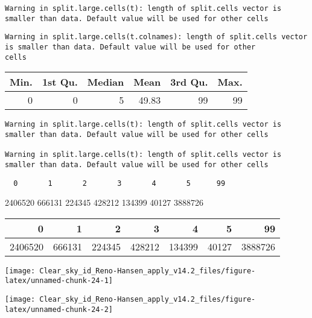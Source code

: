 \documentclass[
  10pt,
  a4paper,oneside]{article}
\begin{document}
\begin{verbatim}
Warning in split.large.cells(t): length of split.cells vector is smaller than data. Default value will be used for other cells
\end{verbatim}

\begin{verbatim}
Warning in split.large.cells(t.colnames): length of split.cells vector is smaller than data. Default value will be used for other
cells
\end{verbatim}

\begin{longtable}[]{@{}rrrrrr@{}}
\toprule
Min. & 1st Qu. & Median & Mean & 3rd Qu. & Max.\tabularnewline
\midrule
\endhead
0 & 0 & 5 & 49.83 & 99 & 99\tabularnewline
\bottomrule
\end{longtable}

\begin{verbatim}
Warning in split.large.cells(t): length of split.cells vector is smaller than data. Default value will be used for other cells

Warning in split.large.cells(t): length of split.cells vector is smaller than data. Default value will be used for other cells
\end{verbatim}

\begin{verbatim}
  0       1       2       3       4       5      99 
\end{verbatim}

2406520 666131 224345 428212 134399 40127 3888726

\begin{longtable}[]{@{}rrrrrrr@{}}
\toprule
0 & 1 & 2 & 3 & 4 & 5 & 99\tabularnewline
\midrule
\endhead
2406520 & 666131 & 224345 & 428212 & 134399 & 40127 & 3888726\tabularnewline
\bottomrule
\end{longtable}

\begin{center}\texttt{[image: Clear\_sky\_id\_Reno-Hansen\_apply\_v14.2\_files/figure-latex/unnamed-chunk-24-1]} \end{center}

\begin{center}\texttt{[image: Clear\_sky\_id\_Reno-Hansen\_apply\_v14.2\_files/figure-latex/unnamed-chunk-24-2]} \end{center}
\end{document}
